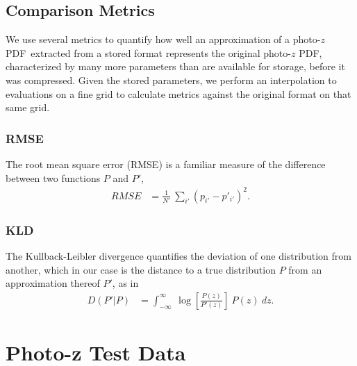 \documentclass[\docopts]{\docclass}
\newcommand{\pz}{photo-$z$ PDF}
\begin{document}
\subsection{Comparison Metrics}
\label{sec:metrics}


We use several metrics to quantify how well an approximation of a \pz\ 
extracted from a stored format represents the original \pz, characterized by 
many more parameters than are available for storage, before it was compressed.  
Given the stored parameters, we perform an interpolation to evaluations on a 
fine grid to calculate metrics against the original format on that same grid.


\subsubsection{RMSE}
\label{sec:rms}

The root mean square error (RMSE) is a familiar measure of the difference 
between two functions $P$ and $P'$,
\begin{align}
  \label{eq:rmse}
  RMSE &= \frac{1}{N'}\ \sum_{i'}(p_{i'} - p'_{i'})^{2}.
\end{align}

\subsubsection{KLD}
\label{sec:kld}

The Kullback-Leibler divergence quantifies the deviation of one distribution 
from another, which in our case is the distance to a true distribution $P$ from 
an approximation thereof $P'$, as in
\begin{align}
  \label{eq:kld}
  D(P' | P) &= \int_{-\infty}^{\infty}\ \log\left[\frac{P(z)}{P'(z)}\right]\ 
P(z)\ dz.
\end{align}




\section{Photo-z Test Data}
\label{sec:data}
\end{document}
